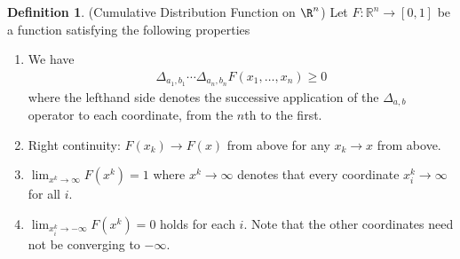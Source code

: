 \documentclass[12pt]{article}
\theoremstyle{plain}
\theoremstyle{definition}
\newtheorem{defn}[thm]{Definition}
\theoremstyle{remark}
\newcommand{\ra}{\rightarrow}
\newcommand{\Rn}{\mathbb{R}^n}
\begin{document}
\begin{defn}(Cumulative Distribution Function on $\R^n$)
\label{defn:F}
Let $F:\Rn\ra[0,1]$ be a function satisfying the following properties
\begin{enumerate}
  \item
    We have
    \begin{align}
      \Delta_{a_1,b_1} \cdots
      \Delta_{a_n,b_n}
      F(x_1,\ldots,x_n) \geq 0
      \label{deltas}
    \end{align}
    where the lefthand side denotes the successive application of the
    $\Delta_{a,b}$ operator to each coordinate, from the $n$th to the
    first.

  \item Right continuity: $F(x_k) \ra F(x)$ from above for any
    $x_k \ra x$ from above.

  \item $\lim_{x^k \ra \infty} F(x^k)=1$ where $x^k\ra \infty$ denotes
    that every coordinate $x^k_i \ra \infty$ for all $i$.

  \item $\lim_{x^k_i\ra-\infty} F(x^k) = 0$ holds for each $i$. Note
    that the other coordinates need not be converging to $-\infty$.
\end{enumerate}
\end{defn}
\end{document}
